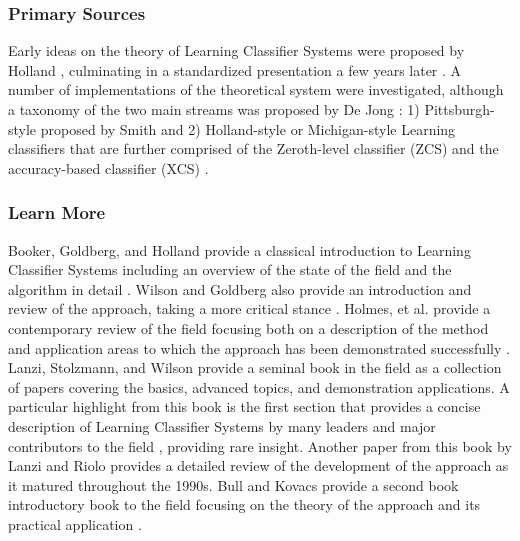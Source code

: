 % 
% 
\subsubsection{Primary Sources}
Early ideas on the theory of Learning Classifier Systems were proposed by Holland \cite{Holland1976, Holland1977}, culminating in a standardized presentation a few years later \cite{Holland1980}.
A number of implementations of the theoretical system were investigated, although a taxonomy of the two main streams was proposed by De Jong \cite{Jong1988}: 1) Pittsburgh-style proposed by Smith \cite{Smith1980, Smith1983} and 2) Holland-style or Michigan-style Learning classifiers that are further comprised of the Zeroth-level classifier (ZCS) \cite{Wilson1994} and the accuracy-based classifier (XCS) \cite{Wilson1995}.

% 
% 
\subsubsection{Learn More}
Booker, Goldberg, and Holland provide a classical introduction to Learning Classifier Systems including an overview of the state of the field and the algorithm in detail \cite{Booker1989}. Wilson and Goldberg also provide an introduction and review of the approach, taking a more critical stance \cite{Wilson1989}.
Holmes, et al. provide a contemporary review of the field focusing both on a description of the method and application areas to which the approach has been demonstrated successfully \cite{Holmes2002}.
Lanzi, Stolzmann, and Wilson provide a seminal book in the field as a collection of papers covering the basics, advanced topics, and demonstration applications. A particular highlight from this book is the first section that provides a concise description of Learning Classifier Systems by many leaders and major contributors to the field \cite{Holland2000}, providing rare insight. Another paper from this book by Lanzi and Riolo provides a detailed review of the development of the approach as it matured throughout the 1990s.
Bull and Kovacs provide  a second book introductory book to the field focusing on the theory of the approach and its practical application \cite{Bull2005}.


